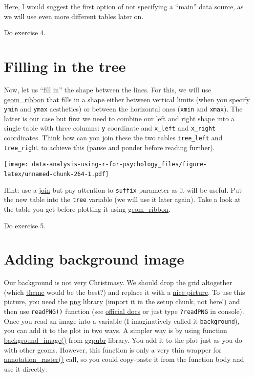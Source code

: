 \documentclass[
]{book}
\begin{document}
Here, I would suggest the first option of not specifying a ``main'' data source, as we will use even more different tables later on.

Do exercise 4.

\hypertarget{filling-in-the-tree}{%
\section{Filling in the tree}\label{filling-in-the-tree}}

Now, let us ``fill in'' the shape between the lines. For this, we will use \href{https://ggplot2.tidyverse.org/reference/geom_ribbon.html}{geom\_ribbon} that fills in a shape either between vertical limits (when you specify \texttt{ymin} and \texttt{ymax} aesthetics) or between the horizontal ones (\texttt{xmin} and \texttt{xmax}). The latter is our case but first we need to combine our left and right shape into a single table with three columns: \texttt{y} coordinate and \texttt{x\_left} and \texttt{x\_right} coordinates. Think how can you join these the two tables \texttt{tree\_left} and \texttt{tree\_right} to achieve this (pause and ponder before reading further).

\texttt{[image: data-analysis-using-r-for-psychology\_files/figure-latex/unnamed-chunk-264-1.pdf]}

Hint: use a \href{https://dplyr.tidyverse.org/reference/mutate-joins.html}{join} but pay attention to \texttt{suffix} parameter as it will be useful. Put the new table into the \texttt{tree} variable (we will use it later again). Take a look at the table you get before plotting it using \href{https://ggplot2.tidyverse.org/reference/geom_ribbon.html}{geom\_ribbon}.

Do exercise 5.

\hypertarget{adding-background-image}{%
\section{Adding background image}\label{adding-background-image}}

Our background is not very Christmasy. We should drop the grid altogether (which \href{https://ggplot2.tidyverse.org/reference/ggtheme.html}{theme} would be the best?) and replace it with a \href{images/christmas-background.png}{nice picture}. To use this picture, you need the \href{https://cran.r-project.org/package=png}{png} library (import it in the setup chunk, not here!) and then use \texttt{readPNG()} function (see \href{https://cran.r-project.org/web/packages/png/png.pdf}{official docs} or just type \texttt{?readPNG} in console). Once you read an image into a variable (I imaginatively called it \texttt{background}), you can add it to the plot in two ways. A simpler way is by using function \href{https://rpkgs.datanovia.com/ggpubr/reference/background_image.html}{background\_image()} from \href{https://rpkgs.datanovia.com/ggpubr/}{ggpubr} library. You add it to the plot just as you do with other geoms. However, this function is only a very thin wrapper for \href{https://ggplot2.tidyverse.org/reference/annotation_raster.html}{annotation\_raster()} call, so you could copy-paste it from the function body and use it directly:
\end{document}
